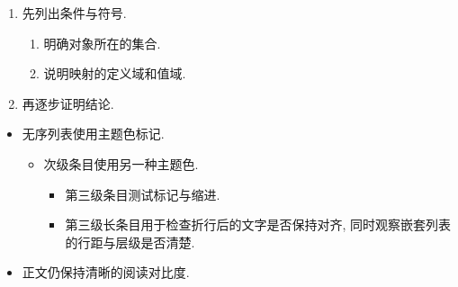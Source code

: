 \documentclass[UTF8,12pt,oneside,fontset=fandol]{ctexbook}
\begin{document}
\begin{enumerate}
    \item
        先列出条件与符号.
        \begin{enumerate}
            \item
                明确对象所在的集合.
            \item
                说明映射的定义域和值域.
        \end{enumerate}
    \item
        再逐步证明结论.
\end{enumerate}
\begin{itemize}
    \item
        无序列表使用主题色标记.
        \begin{itemize}
            \item
                次级条目使用另一种主题色.
                \begin{itemize}
                    \item
                        第三级条目测试标记与缩进.
                    \item
                        第三级长条目用于检查折行后的文字是否保持对齐,
                        同时观察嵌套列表的行距与层级是否清楚.
                \end{itemize}
        \end{itemize}
    \item
        正文仍保持清晰的阅读对比度.
\end{itemize}
\end{document}
